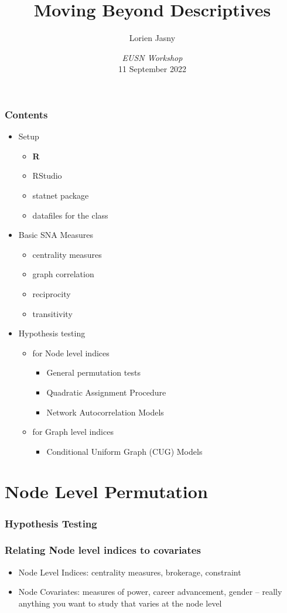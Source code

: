 \documentclass{beamer}
\title[Moving Beyond Descriptives]{Moving Beyond Descriptives}
\author[LJasny]{Lorien Jasny\inst{1}}
\institute[SESYNC]{\inst{1} University of Exeter\\
\texttt{L.Jasny@exeter.ac.uk}\\
				{\insertlogo}}
\date{\textit{EUSN Workshop}\\11 September 2022}
\begin{document}
	\begin{frame}
	\maketitle
	\end{frame}

\begin{frame}
\frametitle{Contents}
\begin{itemize}
\item Setup
\begin{itemize}
\item \textbf{R}
\item RStudio
\item statnet package
\item datafiles for the class
\end{itemize}
\item Basic SNA Measures
\begin{itemize}
\item centrality measures
\item graph correlation
\item reciprocity
\item transitivity
\end{itemize}
\item Hypothesis testing
\begin{itemize}
\item for Node level indices
\begin{itemize}
\item General permutation tests
\item Quadratic Assignment Procedure
\item Network Autocorrelation Models
\end{itemize}
\item for Graph level indices
\begin{itemize}
\item Conditional Uniform Graph (CUG) Models
\end{itemize}
\end{itemize}
\end{itemize}
\end{frame}
\section{Node Level Permutation}
\begin{frame}
\frametitle{Hypothesis Testing}
\end{frame}
\begin{frame}
\frametitle{Relating Node level indices to covariates}
\begin{itemize}
\item Node Level Indices: centrality measures, brokerage, constraint
\pause
\item Node Covariates: measures of power, career advancement, gender -- really anything you want to study that varies at the node level
\end{itemize}
\end{frame}
\end{document}
